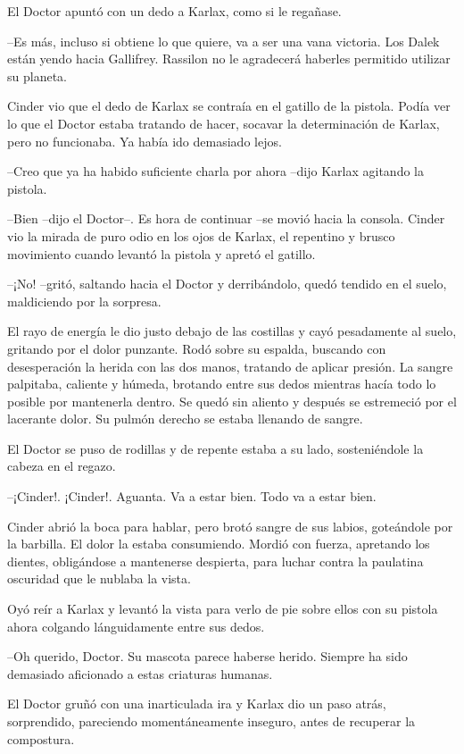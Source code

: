 El Doctor apuntó con un dedo a Karlax, como si le regañase. 

--Es más, incluso si obtiene lo que quiere, va a ser una vana victoria. Los Dalek están yendo hacia Gallifrey. Rassilon no le agradecerá haberles permitido utilizar su planeta.

Cinder vio que el dedo de Karlax se contraía en el gatillo de la pistola. Podía ver lo que el Doctor estaba tratando de hacer, socavar la determinación de Karlax, pero no funcionaba. Ya había ido demasiado lejos.

--Creo que ya ha habido suficiente charla por ahora --dijo Karlax agitando la pistola.

--Bien --dijo el Doctor--. Es hora de continuar --se movió hacia la consola. Cinder vio la mirada de puro odio en los ojos de Karlax, el repentino y brusco movimiento cuando levantó la pistola y apretó el gatillo.

--¡No! --gritó, saltando hacia el Doctor y derribándolo, quedó tendido en el suelo, maldiciendo por la sorpresa.

El rayo de energía le dio justo debajo de las costillas y cayó pesadamente al suelo, gritando por el dolor punzante. Rodó sobre su espalda, buscando con desesperación la herida con las dos manos, tratando de aplicar presión. La sangre palpitaba, caliente y húmeda, brotando entre sus dedos mientras hacía todo lo posible por mantenerla dentro. Se quedó sin aliento y después se estremeció por el lacerante dolor. Su pulmón derecho se estaba llenando de sangre.

El Doctor se puso de rodillas y de repente estaba a su lado, sosteniéndole la cabeza en el regazo. 

--¡Cinder!. ¡Cinder!. Aguanta. Va a estar bien. Todo va a estar bien.

Cinder abrió la boca para hablar, pero brotó sangre de sus labios, goteándole por la barbilla. El dolor la estaba consumiendo. Mordió con fuerza, apretando los dientes, obligándose a mantenerse despierta, para luchar contra la paulatina oscuridad que le nublaba la vista.

Oyó reír a Karlax y levantó la vista para verlo de pie sobre ellos con su pistola ahora colgando lánguidamente entre sus dedos. 

--Oh querido, Doctor. Su mascota parece haberse herido. Siempre ha sido demasiado aficionado a estas criaturas humanas.

El Doctor gruñó con una inarticulada ira y Karlax dio un paso atrás, sorprendido, pareciendo momentáneamente inseguro, antes de recuperar la compostura. 

